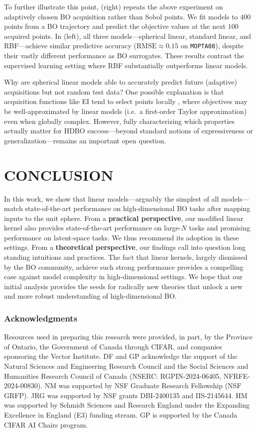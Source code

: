 \documentclass[twoside]{article}
\theoremstyle{plain}
\theoremstyle{definition}
\begin{document}
To further illustrate this point,
 (right) repeats the above experiment
on adaptively chosen BO acquisition rather than Sobol points.
We fit models to $400$ points from a BO trajectory and predict the objective values at the next $100$ acquired points.
In  (left), all three models—spherical linear, standard linear, and RBF—achieve similar predictive accuracy ($\mathrm{RMSE} \approx 0.15$ on \texttt{MOPTA08}), despite their vastly different performance as BO surrogates.
These results contrast the supervised learning setting where RBF substantially outperforms linear models.

Why are spherical linear models able to accurately predict future (adaptive) acquisitions but not random test data?
One possible explanation is that acquisition functions like EI tend to select points locally \citep{garnett2023bayesian}, where objectives may be well-approximated by linear models (i.e.\ a first-order Taylor approximation) even when globally complex.
However, fully characterizing which properties actually matter for HDBO success---beyond standard notions of expressiveness or generalization---remains an important open question.

\section{\bfseries\small CONCLUSION}
In this work, we show that linear models---arguably the simplest of all models---match state-of-the-art performance on high-dimensional BO tasks after mapping inputs to the unit sphere.
From a {\bf practical perspective}, our modified linear kernel also provides state-of-the-art performance on large-$N$ tasks and promising performance on latent-space tasks.
We thus recommend its adoption in these settings.
From a {\bf theoretical perspective}, our findings call into question long standing intuitions and practices.
The fact that linear kernels, largely dismissed by the BO community, achieve such strong performance provides a compelling case against model complexity in high-dimensional settings.
We hope that our initial analysis provides the seeds for radically new theories that unlock a new and more robust understanding of high-dimensional BO.

\subsubsection*{Acknowledgments}
Resources used in preparing this research were provided, in part, by the Province of Ontario, the Government of Canada through CIFAR, and companies sponsoring the Vector Institute.
DF and GP acknowledge the support of the Natural Sciences and Engineering Research Council and the Social Sciences and Humanities Research Council of Canada (NSERC: RGPIN-2024-06405, NFRFE-2024-00830).
NM was supported by NSF Graduate Research Fellowship (NSF GRFP).
JRG was supported by NSF grants DBI-2400135 and IIS-2145644. 
HM was supported by Schmidt Sciences and Research England under the Expanding Excellence in England (E3) funding stream.
GP is supported by the Canada CIFAR AI Chairs program.
\end{document}
